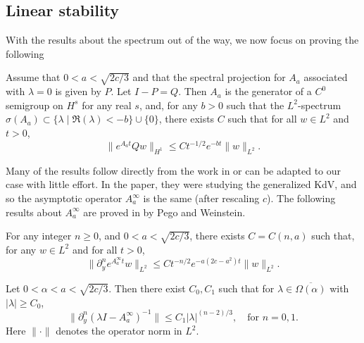 \subsection{Linear stability}

With the results about the spectrum out of the way, we now focus on proving the following 

\begin{theorem}\label{linear-stability-kink}
	Assume that \(0<a<\sqrt{2c/3}\) and that the spectral projection for \(A_a\) associated with \(\lambda = 0\) is given by \(P\). Let \(I - P = Q.\) Then \(A_a\) is the generator of a \(C^0\) semigroup on \(H^s\) for any real \(s\), and, for any \(b>0\) such that the \(L^2\)-spectrum \(\sigma(A_a) \subset \{ \lambda \mid \Re(\lambda) < -b\} \cup \{0\}\), there exists \(C\) such that for all \(w\in L^2\) and \(t>0\),
	\begin{equation}\label{linear-decay-result}
		\| e^{A_a t} Qw \|_{H^1} \leq C t^{-1/2} e^{-bt} \| w \|_{L^2}.
	\end{equation}
\end{theorem}

Many of the results follow directly from the work in \cite[]{pego1994asymptotic} or can be adapted to our case with little effort. In the paper, they were studying the generalized KdV, and so the asymptotic operator \(A_a^\infty\) is the same (after rescaling \(c\)). The following results about \(A_a^\infty\) are proved in by Pego and Weinstein.
\begin{prop}[c.f.\ Proposition 4.1]\label{asymptotic-operator-semigroup-estimate}
	For any integer \(n\geq 0\), and \(0<a<\sqrt{2c/3}\), there exists \(C = C(n,a)\) such that, for any \(w \in L^2\) and for all \(t>0\),
	\begin{equation*} 
		\|\partial_y^n e^{A^\infty_a t} w \|_{L^2} \leq C t^{-n/2} e^{-a(2c-a^2)t} \| w \|_{L^2}.
	\end{equation*} 
\end{prop}

\begin{prop}[c.f.\ Lemma 4.3]\label{derivative-resolvent-estimate}
	Let \(0<\alpha < a < \sqrt{2c/3}\). Then there exist \(C_0, C_1\) such that for \(\lambda\in \overline{\Omega(\alpha)}\) with \(|\lambda| \geq C_0\),
	\begin{equation*} 
		\| \partial_y^n (\lambda I - A_a^\infty)^{-1}\| \leq C_1 |\lambda|^{(n-2)/3}, \quad \text{for } n =0,1.
	\end{equation*} 
	Here \(\|\cdot \|\) denotes the operator norm in \(L^2\).
\end{prop}

